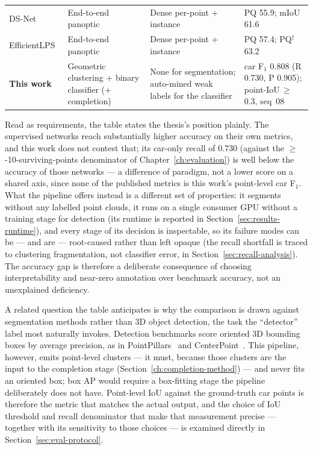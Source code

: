 \begin{table}[H]
\begin{tabular}{@{}p{2.7cm}p{3.5cm}p{3.0cm}p{4.4cm}@{}}
    DS-Net~\cite{hong2021dsnet} & End-to-end panoptic & Dense per-point + instance & PQ 55.9; mIoU 61.6 \\
    EfficientLPS~\cite{sirohi2021efficientlps} & End-to-end panoptic & Dense per-point + instance & PQ 57.4; PQ$^\dagger$ 63.2 \\
    \midrule
    \textbf{This work} & Geometric clustering + binary classifier (+ completion) & None for segmentation; auto-mined weak labels for the classifier & car F$_1$ 0.808 (R 0.730, P 0.905); point-IoU$\,\ge\,$0.3, seq~08 \\
    \bottomrule
  \end{tabular}
\end{table}

Read as requirements, the table states the thesis's position plainly. The supervised
networks reach substantially higher accuracy on their own metrics, and this work does
not contest that; its car-only recall of \num{0.730} (against the
$\ge$-10-surviving-points denominator of Chapter~\ref{ch:evaluation}) is well below the accuracy of those
networks --- a difference of paradigm, not a lower score on a shared axis, since none of
the published metrics is this work's point-level car F$_1$. What the pipeline offers instead is a different set of properties: it
segments without any labelled point clouds, it runs on a single consumer GPU without a
training stage for detection (its runtime is reported in Section~\ref{sec:results-runtime}), and every stage of
its decision is inspectable, so its
failure modes can be --- and are --- root-caused rather than left opaque (the recall
shortfall is traced to clustering fragmentation, not classifier error, in Section~\ref{sec:recall-analysis}).
The accuracy gap is therefore a deliberate consequence of choosing interpretability and
near-zero annotation over benchmark accuracy, not an unexplained deficiency.

A related question the table anticipates is why the comparison is drawn against
segmentation methods rather than 3D object detection, the task the ``detector'' label
most naturally invokes. Detection benchmarks score oriented 3D bounding boxes by average
precision, as in PointPillars~\cite{lang2019pointpillars} and
CenterPoint~\cite{yin2021centerpoint}. This pipeline, however, emits point-level clusters
--- it must, because those clusters are the input to the completion stage (Section~\ref{ch:completion-method}) ---
and never fits an oriented box; box AP would require a box-fitting stage the pipeline
deliberately does not have. Point-level IoU against the ground-truth car points is
therefore the metric that matches the actual output, and the choice of IoU threshold and
recall denominator that make that measurement precise --- together with its sensitivity
to those choices --- is examined directly in Section~\ref{sec:eval-protocol}.

